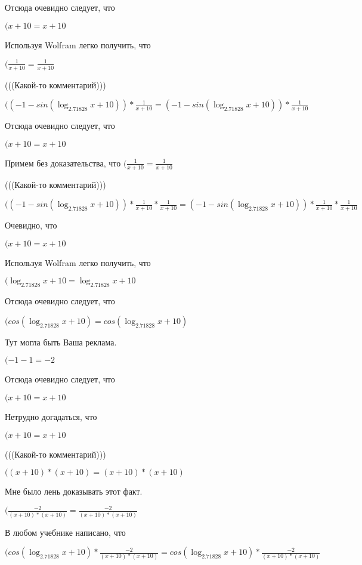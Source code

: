 \documentclass[12pt,a4paper,fleqn]{article}
\theoremstyle{definition}
\begin{document}
Отсюда очевидно следует, что

$( x  +  10  =  x  +  10 $

Используя Wolfram легко получить, что

$(\frac{ 1 }{ x  +  10 }
 = \frac{ 1 }{ x  +  10 }
$

(((Какой-то комментарий)))

$(( -1  - sin(\log_{ 2.71828 }{ x  +  10 })) * \frac{ 1 }{ x  +  10 }
 = ( -1  - sin(\log_{ 2.71828 }{ x  +  10 })) * \frac{ 1 }{ x  +  10 }
$

Отсюда очевидно следует, что

$( x  +  10  =  x  +  10 $

Примем без доказательства, что
$(\frac{ 1 }{ x  +  10 }
 = \frac{ 1 }{ x  +  10 }
$

(((Какой-то комментарий)))

$(( -1  - sin(\log_{ 2.71828 }{ x  +  10 })) * \frac{ 1 }{ x  +  10 }
 * \frac{ 1 }{ x  +  10 }
 = ( -1  - sin(\log_{ 2.71828 }{ x  +  10 })) * \frac{ 1 }{ x  +  10 }
 * \frac{ 1 }{ x  +  10 }
$

Очевидно, что

$( x  +  10  =  x  +  10 $

Используя Wolfram легко получить, что

$(\log_{ 2.71828 }{ x  +  10 } = \log_{ 2.71828 }{ x  +  10 }$

Отсюда очевидно следует, что

$(cos(\log_{ 2.71828 }{ x  +  10 }) = cos(\log_{ 2.71828 }{ x  +  10 })$

Тут могла быть Ваша реклама.

$( -1  -  1  =  -2 $

Отсюда очевидно следует, что

$( x  +  10  =  x  +  10 $

Нетрудно догадаться, что

$( x  +  10  =  x  +  10 $

(((Какой-то комментарий)))

$(( x  +  10 ) * ( x  +  10 ) = ( x  +  10 ) * ( x  +  10 )$

Мне было лень доказывать этот факт.

$(\frac{ -2 }{( x  +  10 ) * ( x  +  10 )}
 = \frac{ -2 }{( x  +  10 ) * ( x  +  10 )}
$

В любом учебнике написано, что

$(cos(\log_{ 2.71828 }{ x  +  10 }) * \frac{ -2 }{( x  +  10 ) * ( x  +  10 )}
 = cos(\log_{ 2.71828 }{ x  +  10 }) * \frac{ -2 }{( x  +  10 ) * ( x  +  10 )}
$
\end{document}
